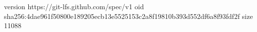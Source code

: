 version https://git-lfs.github.com/spec/v1
oid sha256:4dae961f50800e189205ecb13e5525153c2a8f19810b393d552df6a8f93fdf2f
size 11088
